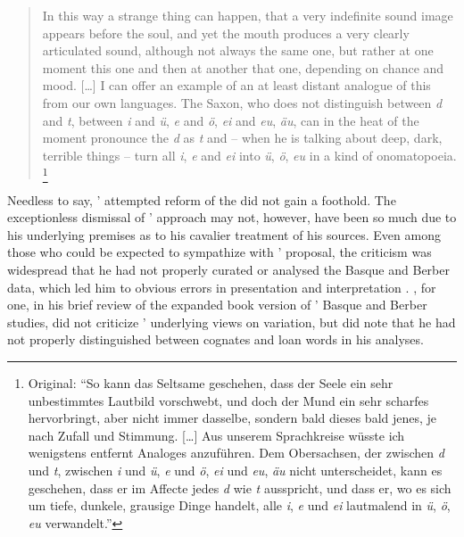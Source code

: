 \documentclass[output=paper]{langscibook}
\begin{document}
\largerpage[-1]
\begin{quotation}
In this way a strange thing can happen, that a very indefinite sound image appears before the soul, and yet the mouth produces a very clearly articulated sound, although not always the same one, but rather at one moment this one and then at another that one, depending on chance and mood. […] I can offer an example of an at least distant analogue of this from our own languages. The Saxon, who does not distinguish between \emph{d} and \emph{t}, between \emph{i} and \emph{ü}, \emph{e} and \emph{ö}, \emph{ei} and \emph{eu}, \emph{äu}, can in the heat of the moment pronounce the \emph{d} as \emph{t} and -- when he is talking about deep, dark, terrible things -- turn all \emph{i}, \emph{e} and \emph{ei} into \emph{ü}, \emph{ö}, \emph{eu} in a kind of onomatopoeia. \citep[606--607]{Gabelentz1893}\footnote{Original: ``So kann das Seltsame geschehen, dass der Seele ein sehr unbestimmtes Lautbild vorschwebt, und doch der Mund ein sehr scharfes hervorbringt, aber nicht immer dasselbe, sondern bald dieses bald jenes, je nach Zufall und Stimmung. […] Aus unserem Sprachkreise wüsste ich wenigstens entfernt Analoges anzuführen. Dem Obersachsen, der zwischen \emph{d} und \emph{t}, zwischen \emph{i} und \emph{ü}, \emph{e} und \emph{ö}, \emph{ei} und \emph{eu}, \emph{äu} nicht unterscheidet, kann es geschehen, dass er im Affecte jedes \emph{d} wie \emph{t} ausspricht, und dass er, wo es sich um tiefe, dunkele, grausige Dinge handelt, alle \emph{i}, \emph{e} und \emph{ei} lautmalend in \emph{ü}, \emph{ö}, \emph{eu} verwandelt.''}
\end{quotation}

Needless to say, {\Gabelentz}' attempted reform of the  did not gain a foothold. The exceptionless dismissal of {\Gabelentz}' approach may not, however, have been so much due to his underlying premises as to his cavalier treatment of his sources. Even among those who could be expected to sympathize with {\Gabelentz}' proposal, the criticism was widespread that he had not properly curated or analysed the Basque and Berber data, which led him to obvious errors in presentation and interpretation \citep[cf.][]{HurchPurgay2019}. \citet{Brinton1894}, for one, in his brief review of the \citeyear{Gabelentz1894bb} expanded book version of {\Gabelentz}' Basque and Berber studies, did not criticize {\Gabelentz}' underlying views on variation, but did note that he had not properly distinguished between cognates and loan words in his analyses.
\end{document}
